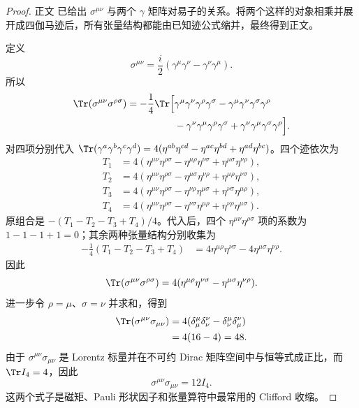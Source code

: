 \begin{proof}
正文 已给出 $\sigma^{\mu\nu}$ 与两个 $\gamma$ 矩阵对易子的关系。将两个这样的对象相乘并展开成四伽马迹后，所有张量结构都能由已知迹公式缩并，最终得到正文。



定义
\begin{equation*}
\sigma^{\mu\nu}=\frac{i}{2}(\gamma^\mu\gamma^\nu-\gamma^\nu\gamma^\mu).
\end{equation*}
所以
\begin{align*}
\Tr(\sigma^{\mu\nu}\sigma^{\rho\sigma})
=-\frac14\Tr\Big[&
\gamma^\mu\gamma^\nu\gamma^\rho\gamma^\sigma
-\gamma^\mu\gamma^\nu\gamma^\sigma\gamma^\rho\\
&-\gamma^\nu\gamma^\mu\gamma^\rho\gamma^\sigma
+\gamma^\nu\gamma^\mu\gamma^\sigma\gamma^\rho
\Big].
\end{align*}
对四项分别代入
\(
\Tr(\gamma^a\gamma^b\gamma^c\gamma^d)
=4(\eta^{ab}\eta^{cd}-\eta^{ac}\eta^{bd}+\eta^{ad}\eta^{bc})
\)。四个迹依次为
\begin{align*}
T_1&=4(\eta^{\mu\nu}\eta^{\rho\sigma}
-\eta^{\mu\rho}\eta^{\nu\sigma}
+\eta^{\mu\sigma}\eta^{\nu\rho}),\\
T_2&=4(\eta^{\mu\nu}\eta^{\rho\sigma}
-\eta^{\mu\sigma}\eta^{\nu\rho}
+\eta^{\mu\rho}\eta^{\nu\sigma}),\\
T_3&=4(\eta^{\mu\nu}\eta^{\rho\sigma}
-\eta^{\nu\rho}\eta^{\mu\sigma}
+\eta^{\nu\sigma}\eta^{\mu\rho}),\\
T_4&=4(\eta^{\mu\nu}\eta^{\rho\sigma}
-\eta^{\nu\sigma}\eta^{\mu\rho}
+\eta^{\nu\rho}\eta^{\mu\sigma}).
\end{align*}
原组合是 $-(T_1-T_2-T_3+T_4)/4$。代入后，四个
$\eta^{\mu\nu}\eta^{\rho\sigma}$ 项的系数为 $1-1-1+1=0$；其余两种张量结构分别收集为
\begin{align*}
-\frac14(T_1-T_2-T_3+T_4)
&=4\eta^{\mu\rho}\eta^{\nu\sigma}
-4\eta^{\mu\sigma}\eta^{\nu\rho}.
\end{align*}
因此
\begin{equation*}
{
\Tr(\sigma^{\mu\nu}\sigma^{\rho\sigma})
=4(\eta^{\mu\rho}\eta^{\nu\sigma}
-\eta^{\mu\sigma}\eta^{\nu\rho}).}
\end{equation*}
进一步令 $\rho=\mu$、$\sigma=\nu$ 并求和，得到
\begin{align*}
\Tr(\sigma^{\mu\nu}\sigma_{\mu\nu})
&=4(\delta^\mu_\mu\delta^\nu_\nu-\delta^\mu_\nu\delta^\nu_\mu)\\
&=4(16-4)=48.
\end{align*}
由于 $\sigma^{\mu\nu}\sigma_{\mu\nu}$ 是 Lorentz 标量并在不可约 Dirac 矩阵空间中与恒等式成正比，而 $\Tr I_4=4$，因此
\begin{equation*}
\sigma^{\mu\nu}\sigma_{\mu\nu}=12I_4.
\end{equation*}
这两个式子是磁矩、Pauli 形状因子和张量算符中最常用的 Clifford 收缩。
\end{proof}

